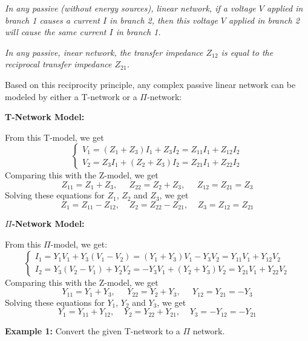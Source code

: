 {\em 
In any passive (without energy sources), 
linear network, if a voltage $V$ applied in branch 1 causes a current $I$ in 
branch 2, then this voltage $V$ applied in branch 2 will cause the same current
$I$ in branch 1.}

{\em In any passive, inear network, the transfer impedance $Z_{12}$ is equal 
to the reciprocal transfer impedance $Z_{21}$.}

Based on this reciprocity principle, any complex passive linear network can
be modeled by either a T-network or a $\Pi$-network:

{\bf T-Network Model:}


From this T-model, we get
\[	\left\{ \begin{array}{l} V_1=(Z_1+Z_3)I_1+Z_3I_2=Z_{11}I_1+Z_{12}I_2 \\
		V_2=Z_3I_1+(Z_2+Z_3)I_2=Z_{21}I_1+Z_{22}I_2  \end{array} \right. \]
Comparing this with the Z-model, we get
\[ Z_{11}=Z_1+Z_3,\;\;\;\;\;Z_{22}=Z_2+Z_3,\;\;\;\;\;Z_{12}=Z_{21}=Z_3	\]
Solving these equations for $Z_1$, $Z_2$ and $Z_3$, we get
\[ Z_1=Z_{11}-Z_{12},\;\;\;\;Z_2=Z_{22}-Z_{21},\;\;\;\;Z_3=Z_{12}=Z_{21} \]

{\bf $\Pi$-Network Model:}

From this $\Pi$-model, we get:
\[ \left\{ \begin{array}{l} 
I_1=Y_1V_1+Y_3(V_1-V_2)=(Y_1+Y_3)V_1-Y_3V_2=Y_{11}V_1+Y_{12}V_2 \\
I_2=Y_3(V_2-V_1)+Y_2V_2=-Y_3V_1+(Y_2+Y_3)V_2=Y_{21}V_1+Y_{22}V_2 \end{array} \right. \]
Comparing this with the Z-model, we get
\[ Y_{11}=Y_1+Y_3,\;\;\;\;\;Y_{22}=Y_2+Y_3,\;\;\;\;\;Y_{12}=Y_{21}=-Y_3	\]
Solving these equations for $Y_1$, $Y_2$ and $Y_3$, we get
\[ Y_1=Y_{11}+Y_{12},\;\;\;\;Y_2=Y_{22}+Y_{21},\;\;\;\;Y_3=-Y_{12}=-Y_{21} \]

{\bf Example 1:} Convert the given T-network to a $\Pi$ network.


